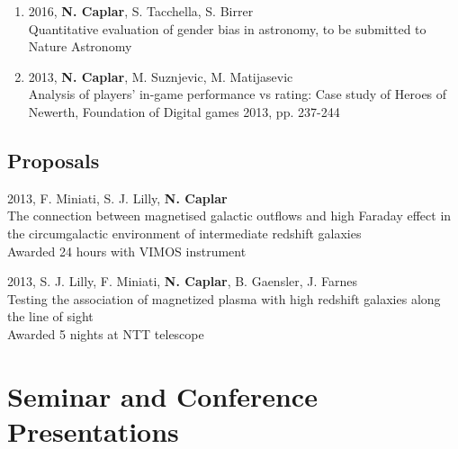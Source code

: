 \documentclass[11pt,letterpaper]{article}
\renewenvironment{itemize}{
  \begin{list}{}{
    \setlength{\leftmargin}{1.5em}
    \setlength{\itemsep}{0.15em}
    \setlength{\parskip}{0pt}
    \setlength{\parsep}{0.25em}
  }
}{
  \end{list}
}
\begin{document}
\begin{enumerate}[resume]
\item 2016, \textbf{N. Caplar}, S. Tacchella, S. Birrer \\ Quantitative evaluation of gender bias in astronomy, to be submitted to Nature Astronomy 

\item 2013,  \textbf{N. Caplar}, M. Suznjevic, M. Matijasevic  \\ Analysis of players' in-game performance vs rating: Case study of Heroes of Newerth, Foundation of Digital games 2013,  pp. 237-244
\end{enumerate}

\subsection*{Proposals}
\begin{itemize}
\item 2013, F. Miniati, S. J. Lilly, \textbf{N. Caplar} \\ The connection between magnetised galactic outflows and high Faraday effect in the circumgalactic environment of intermediate redshift galaxies \\ Awarded 24 hours with VIMOS instrument
\item 2013, S. J. Lilly, F. Miniati,  \textbf{N. Caplar}, B. Gaensler, J. Farnes  \\ Testing the association of magnetized plasma with high redshift galaxies along the line of sight \\ 
Awarded 5 nights at NTT telescope
\end{itemize}


\section*{Seminar and Conference Presentations}
\end{document}
